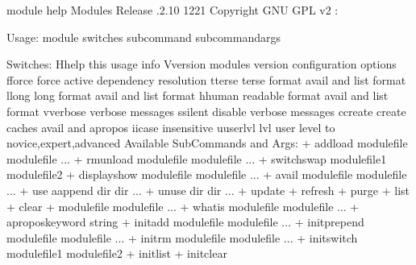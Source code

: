 \documentclass[letterpaper,10pt,english]{sphinxmanual}
\begin{document}
\begin{sphinxVerbatim}[commandchars=\\\{\}]
\PYGZdl{}\PYGZgt{} module \PYGZhy{}\PYGZhy{}help
  Modules Release .2.10 \PYGZhy{}12\PYGZhy{}21 Copyright GNU GPL v2 :

  Usage: module \PYG{o}{[} switches \PYG{o}{]} \PYG{o}{[} subcommand \PYG{o}{]} \PYG{o}{[}subcommand\PYGZhy{}args \PYG{o}{]}

  Switches:
      \PYGZhy{}H\PYGZhy{}\PYGZhy{}help               this usage info
      \PYGZhy{}V\PYGZhy{}\PYGZhy{}version            modules version  configuration options
      \PYGZhy{}f\PYGZhy{}\PYGZhy{}force              force active dependency resolution
      \PYGZhy{}t\PYGZhy{}\PYGZhy{}terse              terse    format avail and list format
      \PYGZhy{}l\PYGZhy{}\PYGZhy{}long               long     format avail and list format
      \PYGZhy{}h\PYGZhy{}\PYGZhy{}human              readable format avail and list format
      \PYGZhy{}v\PYGZhy{}\PYGZhy{}verbose              verbose messages
      \PYGZhy{}s\PYGZhy{}\PYGZhy{}silent             disable verbose messages
      \PYGZhy{}c\PYGZhy{}\PYGZhy{}create             create caches  avail and apropos
      \PYGZhy{}i\PYGZhy{}\PYGZhy{}icase               insensitive
      \PYGZhy{}u\PYGZhy{}\PYGZhy{}userlvl \PYGZlt{}lvl\PYGZgt{}       user level to nov\PYG{o}{[}ice\PYG{o}{]},exp\PYG{o}{[}ert\PYG{o}{]},adv\PYG{o}{[}anced\PYG{o}{]}
  Available SubCommands and Args:
      + addload              modulefile \PYG{o}{[}modulefile ...\PYG{o}{]}
      + rmunload             modulefile \PYG{o}{[}modulefile ...\PYG{o}{]}
      + switchswap           \PYG{o}{[}modulefile1\PYG{o}{]} modulefile2
      + displayshow          modulefile \PYG{o}{[}modulefile ...\PYG{o}{]}
      + avail                 \PYG{o}{[}modulefile \PYG{o}{[}modulefile ...\PYG{o}{]}\PYG{o}{]}
      + use \PYG{o}{[}\PYGZhy{}a\PYGZhy{}\PYGZhy{}append\PYG{o}{]}     dir \PYG{o}{[}dir ...\PYG{o}{]}
      + unuse                 dir \PYG{o}{[}dir ...\PYG{o}{]}
      + update
      + refresh
      + purge
      + list
      + clear
      +                   \PYG{o}{[}modulefile \PYG{o}{[}modulefile ...\PYG{o}{]}\PYG{o}{]}
      + whatis                \PYG{o}{[}modulefile \PYG{o}{[}modulefile ...\PYG{o}{]}\PYG{o}{]}
      + aproposkeyword       string
      + initadd               modulefile \PYG{o}{[}modulefile ...\PYG{o}{]}
      + initprepend           modulefile \PYG{o}{[}modulefile ...\PYG{o}{]}
      + initrm                modulefile \PYG{o}{[}modulefile ...\PYG{o}{]}
      + initswitch            modulefile1 modulefile2
      + initlist
      + initclear
\end{sphinxVerbatim}
\end{document}
